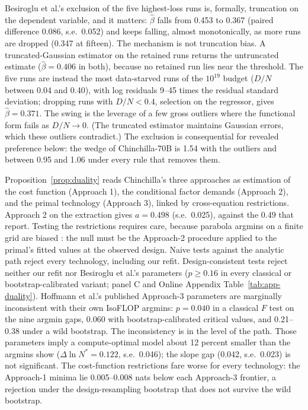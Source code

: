 Besiroglu et al.'s exclusion of the five highest-loss runs is, formally, truncation on the dependent variable, and it
matters: $\hat\beta$ falls from 0.453 to 0.367 (paired difference 0.086, s.e.\ 0.052) and keeps falling, almost
monotonically, as more runs are dropped (0.347 at fifteen). The mechanism is not truncation bias. A truncated-Gaussian
estimator \citep{hausman1977social} on the retained runs returns the untruncated estimate ($\hat\beta=0.406$ in both),
because no retained run lies near the threshold. The five runs are instead the most data-starved runs of the
$10^{19}$ budget ($D/N$ between 0.04 and 0.40), with log residuals 9--45 times the residual standard deviation;
dropping runs with $D/N<0.4$, selection on the regressor, gives $\hat\beta=0.371$. The swing is the leverage of a few
gross outliers where the functional form fails as $D/N\to0$. (The truncated estimator maintains Gaussian errors, which
these outliers contradict.) The exclusion is consequential for revealed preference below: the wedge of Chinchilla-70B
is 1.54 with the outliers and between 0.95 and 1.06 under every rule that removes them.

Proposition~\ref{prop:duality} reads Chinchilla's three approaches as estimation of the cost function (Approach 1),
the conditional factor demands (Approach 2), and the primal technology (Approach 3), linked by cross-equation
restrictions. Approach 2 on the extraction gives $a=0.498$ (s.e.\ 0.025), against the 0.49 that
\citet{hoffmann2022training} report. Testing the restrictions requires care, because parabola argmins on a finite grid
are biased \citep{czech2026problems}: the null must be the Approach-2 procedure applied to the primal's fitted values
at the observed design. Naive tests against the analytic path reject every technology, including our refit.
Design-consistent tests reject neither our refit nor Besiroglu et al.'s parameters ($p\ge0.16$ in every classical or
bootstrap-calibrated variant; panel C and Online Appendix Table~\ref{tab:app-duality}). Hoffmann et al.'s published Approach-3 parameters are marginally inconsistent
with their own IsoFLOP argmins: $p=0.040$ in a classical $F$ test on the nine argmin gaps, 0.060 with
bootstrap-calibrated critical values, and 0.21--0.38 under a wild bootstrap. The inconsistency is in the level of the path.
Those parameters imply a compute-optimal model about 12 percent smaller than the argmins show ($\Delta\ln N^*=0.122$,
s.e.\ 0.046); the slope gap (0.042, s.e.\ 0.023) is not significant. The cost-function restrictions fare worse for
every technology: the Approach-1 minima lie 0.005--0.008 nats below each Approach-3 frontier, a rejection under the
design-resampling bootstrap that does not survive the wild bootstrap.

